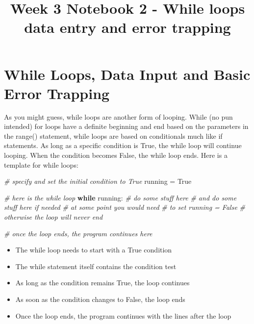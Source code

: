 \documentclass[11pt]{article}
\title{Week 3 Notebook 2 - While loops data entry and error trapping}
\providecommand{\tightlist}{%
      \setlength{\itemsep}{0pt}\setlength{\parskip}{0pt}}
\newenvironment{Shaded}{}{}
\newcommand{\CommentTok}[1]{\textcolor[rgb]{0.38,0.63,0.69}{\textit{{#1}}}}
\newcommand{\NormalTok}[1]{{#1}}
\newcommand{\VariableTok}[1]{\textcolor[rgb]{0.10,0.09,0.49}{{#1}}}
\newcommand{\ControlFlowTok}[1]{\textcolor[rgb]{0.00,0.44,0.13}{\textbf{{#1}}}}
\newcommand{\OperatorTok}[1]{\textcolor[rgb]{0.40,0.40,0.40}{{#1}}}
\begin{document}
    
    
    \maketitle
    
    

    
    \hypertarget{while-loops-data-input-and-basic-error-trapping}{%
\section{While Loops, Data Input and Basic Error
Trapping}\label{while-loops-data-input-and-basic-error-trapping}}

As you might guess, while loops are another form of looping. While (no
pun intended) for loops have a definite beginning and end based on the
parameters in the range() statement, while loops are based on
conditionals much like if statements. As long as a specific condition is
True, the while loop will continue looping. When the condition becomes
False, the while loop ends. Here is a template for while loops:

\begin{Shaded}
\begin{Highlighting}[]
\CommentTok{# specify and set the initial condition to True}
\NormalTok{running }\OperatorTok{=} \VariableTok{True}

\CommentTok{# here is the while loop}
\ControlFlowTok{while}\NormalTok{ running:}
    \CommentTok{# do some stuff here}
    \CommentTok{# and do some stuff here if needed}
    \CommentTok{# at some point you would need}
    \CommentTok{# to set running = False}
    \CommentTok{# otherwise the loop will never end}
    
\CommentTok{# once the loop ends, the program continues here}
\end{Highlighting}
\end{Shaded}

\begin{itemize}
\tightlist
\item
  The while loop needs to start with a True condition
\item
  The while statement itself contains the condition test
\item
  As long as the condition remains True, the loop continues
\item
  As soon as the condition changes to False, the loop ends
\item
  Once the loop ends, the program continues with the lines after the
  loop
\end{itemize}
\end{document}
